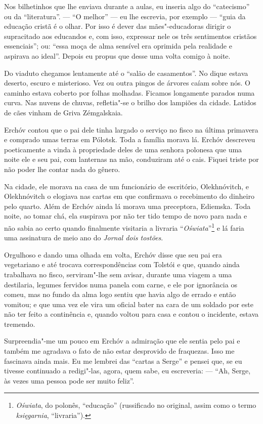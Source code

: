 Nos bilhetinhos que lhe enviava durante a aulas, eu inseria algo do
``catecismo'' ou da ``literatura''. --- ``O melhor'' --- eu lhe
escrevia, por exemplo --- ``guia da educação cristã é o olhar. Por isso
é dever das mães"-educadoras dirigir o supracitado aos educandos e, com
isso, expressar nele os três sentimentos cristãos essenciais''; ou:
``essa moça de alma sensível era oprimida pela realidade e aspirava ao
ideal''. Depois eu propus que desse uma volta comigo à noite.

Do viaduto chegamos lentamente até o ``salão de casamentos''. No dique
estava deserto, escuro e misterioso. Vez ou outra pingos de árvores
caíam sobre nós. O caminho estava coberto por folhas molhadas. Ficamos
longamente parados numa curva. Nas nuvens de chuvas, refletia"-se o %
brilho dos lampiões da cidade. Latidos de cães vinham de Griva
Zémgalskaia.

Erchóv contou que o pai dele tinha largado o serviço no fisco na última
primavera e comprado umas terras em Pólotsk. Toda a família morava lá.
Erchóv descreveu poeticamente a vinda à propriedade deles de uma senhora
polonesa que uma noite ele e seu pai, com lanternas na mão, conduziram
até o cais. Fiquei triste por não poder lhe contar nada do gênero.

Na cidade, ele morava na casa de um funcionário de escritório,
Olekhnóvitch, e Olekhnóvitch o elogiava nas cartas em que confirmava o
recebimento do dinheiro pelo quarto. Além de Erchóv ainda lá morava uma
preceptora, Ediemska. Toda noite, ao tomar chá, ela suspirava por não
ter tido tempo de novo para nada e não sabia ao certo quando finalmente
visitaria a livraria ``\emph{Oświata}''\footnote{\emph{Oświata}, do
  polonês, ``educação'' (russificado no original, assim como o termo
  \emph{księgarnia}, ``livraria'').} e lá faria uma assinatura de meio
ano do \emph{Jornal dois tostões}.

Orgulhoso e dando uma olhada em volta, Erchóv disse que seu pai era
vegetariano e até trocava correspondências com Tolstói e que, quando
ainda trabalhava no fisco, serviram"-lhe sem avisar, durante uma viagem a
uma destilaria, legumes fervidos numa panela com carne, e ele por
ignorância os comeu, mas no fundo da alma logo sentiu que havia algo de
errado e então vomitou; e que uma vez ele vira um oficial bater na cara
de um soldado por este não ter feito a continência e, quando voltou para
casa e contou o incidente, estava tremendo.

Surpreendia"-me um pouco em Erchóv a admiração que ele sentia pelo pai e
também me agradava o fato de não estar desprovido de fraquezas. Isso me
fascinava ainda mais. Eu me lembrei das ``cartas a Serge'' e pensei que,
se eu tivesse continuado a redigi"-las, agora, quem sabe, eu escreveria:
--- ``Ah, Serge, às vezes uma pessoa pode ser muito feliz''.

